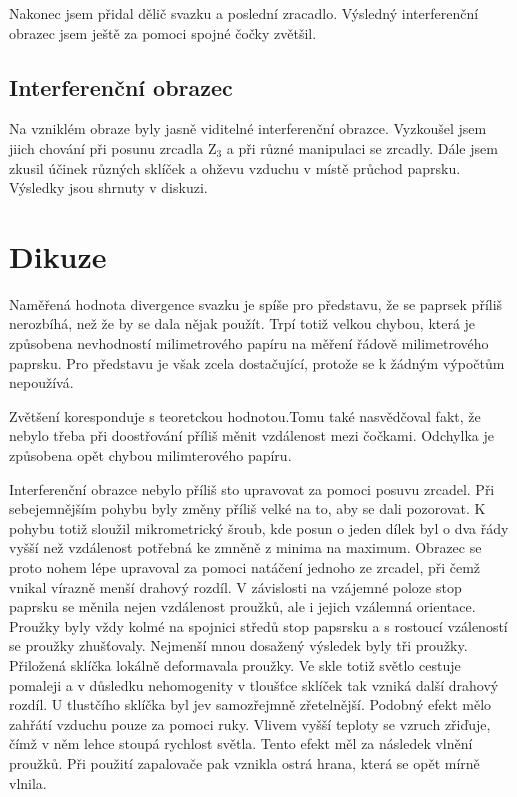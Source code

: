 \documentclass[a4paper,12pt]{article}
\begin{document}
Nakonec jsem přidal dělič svazku a poslední zracadlo. Výsledný interferenční obrazec jsem ještě za pomoci spojné čočky zvětšil.

\subsection{Interferenční obrazec}
Na vzniklém obraze byly jasně viditelné interferenční obrazce. Vyzkoušel jsem jiich chování při posunu zrcadla Z$_3$ a při různé 
manipulaci se zrcadly. Dále jsem zkusil účinek různých sklíček a ohževu vzduchu v místě průchod paprsku. Výsledky jsou shrnuty v diskuzi.

\section{Dikuze}
Naměřená hodnota divergence svazku je spíše pro představu, že se paprsek příliš nerozbíhá, než že by se dala nějak použít. Trpí totiž 
velkou chybou, která je způsobena nevhodností milimetrového papíru na měření řádově milimetrového paprsku. Pro představu je však zcela dostačující, 
protože se k žádným výpočtům nepoužívá.

Zvětšení koresponduje s teoretckou hodnotou.Tomu také nasvědčoval fakt, že nebylo třeba při doostřování příliš měnit vzdálenost mezi čočkami. 
Odchylka je způsobena opět chybou milimterového papíru.

Interferenční obrazce nebylo příliš sto upravovat za pomoci posuvu zrcadel. Při sebejemnějším pohybu byly změny příliš velké na to, aby se dali pozorovat. 
K pohybu totiž sloužil mikrometrický šroub, kde posun o jeden dílek byl o dva řády vyšší než vzdálenost potřebná ke zmněně z minima na maximum. Obrazec se 
proto nohem lépe upravoval za pomoci natáčení jednoho ze zrcadel, při čemž vnikal vírazně menší drahový rozdíl. V závislosti na vzájemné poloze stop paprsku 
se měnila nejen vzdálenost proužků, ale i jejich vzálemná orientace. Proužky byly vždy kolmé na spojnici středů stop papsrsku a s rostoucí vzáleností se proužky 
zhušťovaly. Nejmenší mnou dosažený výsledek byly tři proužky. Přiložená sklíčka lokálně deformavala proužky. Ve skle totiž světlo cestuje pomaleji a v důsledku 
nehomogenity v tloušťce sklíček tak vzniká další drahový rozdíl. U tlustčího sklíčka byl jev samozřejmně zřetelnější. Podobný efekt mělo zahřátí  vzduchu pouze 
za pomoci ruky. Vlivem vyšší teploty se vzruch zřiďuje, čímž v něm lehce stoupá rychlost světla. Tento efekt měl za následek vlnění proužků. Při použití zapalovače 
pak vznikla ostrá hrana, která se opět mírně vlnila.
\end{document}
